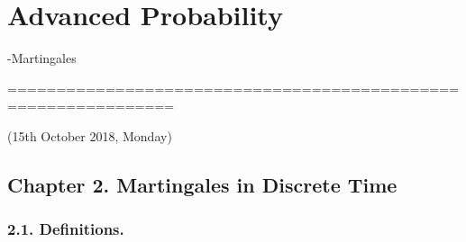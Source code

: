 \documentclass[10pt,a4paper]{report}
\begin{document}
\newcommand{\thm}{\textbf{Theorem) }}
\newcommand{\thmnum}[1]{\textbf{Theorem #1) }}
\newcommand{\defi}{\textbf{Definition) }}
\newcommand{\definum}[1]{\textbf{Definition #1) }}
\newcommand{\lem}{\textbf{Lemma) }}
\newcommand{\lemnum}[1]{\textbf{Lemma #1) }}
\newcommand{\prop}{\textbf{Proposition)}}
\newcommand{\propnum}[1]{\textbf{Proposition #1) }}
\newcommand{\corr}{\textbf{Corollary) }}
\newcommand{\corrnum}[1]{\textbf{Corollary #1) }}
\newcommand{\pf}{\textbf{proof) }}


\newcommand{\lap}{\triangle} %
\newcommand{\s}{\vspace{10pt}}
\newcommand{\bull}{$\bullet$}
\newcommand{\sta}{$\star$}
\newcommand{\reals}{\mathbb{R}}

\newcommand{\eop}{\hfill  \textsl{(End of proof)} $\square$} %
\newcommand{\eos}{\hfill  \textsl{(End of statement)} $\square$} %


\newcommand{\intN}{\mathbb{Z}_N}
\newcommand{\nat}{\mathbb{N}}
\newcommand{\norms}[2]{\parallel #1 \parallel_{#2}}
\newcommand{\avg}{\mathbb{E}}
\newcommand{\prob}{\mathbb{P}}
\newcommand{\borel}{\mathscr{B}}
\newcommand{\EE}{\mathscr{E}}
\newcommand{\cov}{\text{Cov}}
\newcommand{\var}{\text{Var}}
\newcommand{\cha}{1}


\newcommand{\newday}{===============================================================}

\setlength\parindent{0pt}

\chapter*{Advanced Probability}
\s

\begin{large}
-Martingales
\end{large}

\newday

(15th October 2018, Monday)
\s

\section*{Chapter 2. Martingales in Discrete Time}

\subsection*{2.1. Definitions.}

\newcommand{\F}{\mathscr{F}}
\newcommand{\G}{\mathscr{G}}
\end{document}
